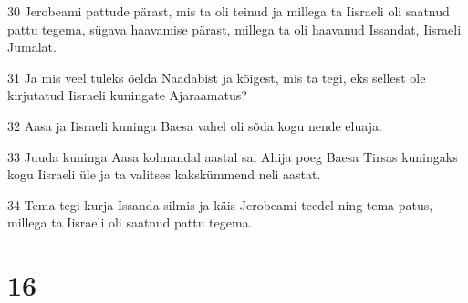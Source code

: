 \par 30 Jerobeami pattude pärast, mis ta oli teinud ja millega ta Iisraeli oli saatnud pattu tegema, sügava haavamise pärast, millega ta oli haavanud Issandat, Iisraeli Jumalat.
\par 31 Ja mis veel tuleks öelda Naadabist ja kõigest, mis ta tegi, eks sellest ole kirjutatud Iisraeli kuningate Ajaraamatus?
\par 32 Aasa ja Iisraeli kuninga Baesa vahel oli sõda kogu nende eluaja.
\par 33 Juuda kuninga Aasa kolmandal aastal sai Ahija poeg Baesa Tirsas kuningaks kogu Iisraeli üle ja ta valitses kakskümmend neli aastat.
\par 34 Tema tegi kurja Issanda silmis ja käis Jerobeami teedel ning tema patus, millega ta Iisraeli oli saatnud pattu tegema.

\chapter{16}

